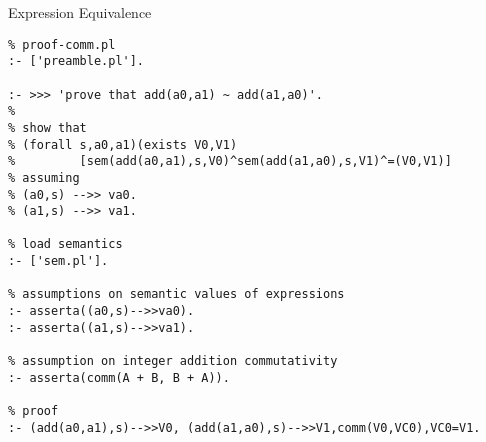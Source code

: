 \documentclass{beamer}
\begin{document}
\begin{frame}[fragile]{Expression Equivalence}
\scriptsize
\begin{verbatim}
% proof-comm.pl
:- ['preamble.pl'].

:- >>> 'prove that add(a0,a1) ~ add(a1,a0)'.
%
% show that
% (forall s,a0,a1)(exists V0,V1)
%         [sem(add(a0,a1),s,V0)^sem(add(a1,a0),s,V1)^=(V0,V1)]                              
% assuming                                                                                  
% (a0,s) -->> va0.                                                                          
% (a1,s) -->> va1.                                                                          
                                                                                            
% load semantics                                                                            
:- ['sem.pl'].                                                                              
                                                                                            
% assumptions on semantic values of expressions                                             
:- asserta((a0,s)-->>va0).                                                                  
:- asserta((a1,s)-->>va1).                                                                  
                                                                                            
% assumption on integer addition commutativity                                              
:- asserta(comm(A + B, B + A)).                                                             
                                                                                            
% proof                                                                                     
:- (add(a0,a1),s)-->>V0, (add(a1,a0),s)-->>V1,comm(V0,VC0),VC0=V1.
\end{verbatim}
\end{frame}
\end{document}
